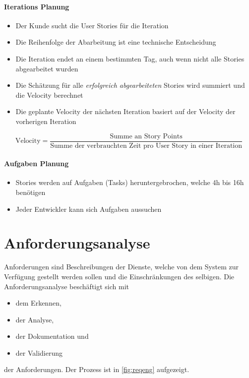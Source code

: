 				\paragraph{Iterations Planung}
					\begin{itemize}
						\item Der Kunde sucht die User Stories für die Iteration
						\item Die Reihenfolge der Abarbeitung ist eine technische Entscheidung
						\item Die Iteration endet an einem bestimmten Tag, auch wenn nicht alle Stories abgearbeitet wurden
						\item Die Schätzung für alle \textit{erfolgreich abgearbeiteten} Stories wird summiert und die Velocity berechnet
						\item Die geplante Velocity der nächsten Iteration basiert auf der Velocity der vorherigen Iteration
					\end{itemize}
					
					\begin{equation*}
						\text{Velocity} = \frac{\text{Summe an Story Points}}{\text{Summe der verbrauchten Zeit pro User Story in einer Iteration}}
					\end{equation*}
				
				\paragraph{Aufgaben Planung}
					\begin{itemize}
						\item Stories werden auf Aufgaben (Tasks) heruntergebrochen, welche 4h bis 16h benötigen
						\item Jeder Entwickler kann sich Aufgaben aussuchen
					\end{itemize}
	
	\section{Anforderungsanalyse}
		\label{sec:anforderungsanalyse}
	
		Anforderungen sind Beschreibungen der Dienste, welche von dem System zur Verfügung gestellt werden sollen und die Einschränkungen des selbigen. Die Anforderungsanalyse beschäftigt sich mit
		\begin{itemize}
			\item dem Erkennen,
			\item der Analyse,
			\item der Dokumentation und
			\item der Validierung
		\end{itemize}
		der Anforderungen. Der Prozess ist in \ref{fig:reqeng} aufgezeigt.
		
